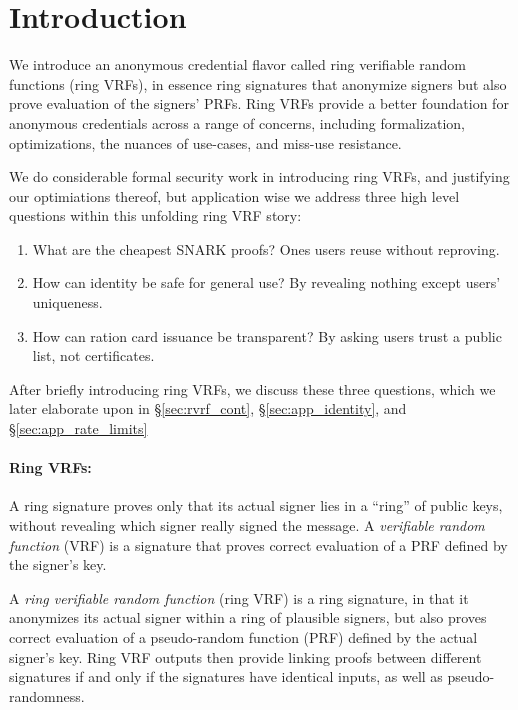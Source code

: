 \section{Introduction}

\def\qaudbreak{\eprint{\quad}{\\}}


We introduce an anonymous credential flavor called
 ring verifiable random functions (ring VRFs),
in essence ring signatures that anonymize signers but
 also prove evaluation of the signers' PRFs.
Ring VRFs provide a better foundation for anonymous credentials
across a range of concerns, including formalization, optimizations,
the nuances of use-cases, and miss-use resistance.

We do considerable formal security work in introducing ring VRFs,
and justifying our optimiations thereof, but application wise 
we address three high level questions within this unfolding ring VRF story:
\begin{enumerate}
\item
What are the cheapest SNARK proofs?  \qaudbreak
Ones users reuse without reproving.
\item
How can identity be safe for general use?  \qaudbreak
By revealing nothing except users' uniqueness.
\item
How can ration card issuance be transparent?  \qaudbreak
By asking users trust a public list, not certificates.
\end{enumerate}

After briefly introducing ring VRFs, we discuss these three questions,
which we later elaborate upon in
 \S\ref{sec:rvrf_cont}, \S\ref{sec:app_identity}, and \S\ref{sec:app_rate_limits} 

\paragraph{Ring VRFs:}

A ring signature \cite{ring_accountable,ring_efficient,ring_linkable,ring_noRO,ring_sublinear} proves only that its actual signer lies in a ``ring''
of public keys, without revealing which signer really signed the message.
A {\it verifiable random function} (VRF) is a signature that proves
correct evaluation of a PRF defined by the signer's key.

A {\it ring verifiable random function} (ring VRF) is a ring signature, in
that it anonymizes its actual signer within a ring of plausible signers,
but also proves correct evaluation of a pseudo-random function (PRF)
defined by the actual signer's key. %
%
Ring VRF outputs then provide linking proofs between different signatures
if and only if the signatures have identical inputs, as well as pseudo-randomness.

